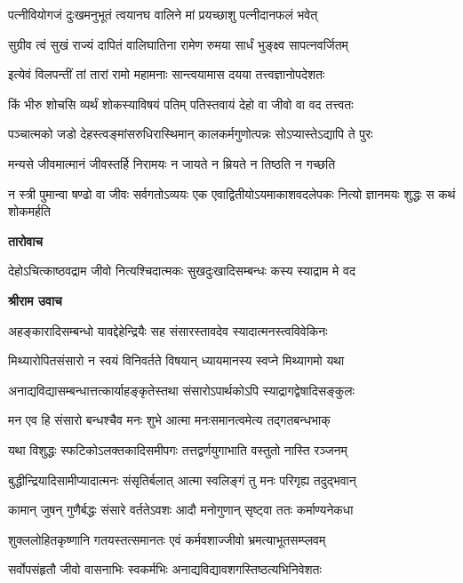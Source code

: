 \twolineshloka
{पत्नीवियोगजं दुःखमनुभूतं त्वयानघ}
{वालिने मां प्रयच्छाशु पत्नीदानफलं भवेत्} %

\twolineshloka
{सुग्रीव त्वं सुखं राज्यं दापितं वालिघातिना}
{रामेण रुमया सार्धं भुङ्क्ष्व सापत्नवर्जितम्} %

\twolineshloka
{इत्येवं विलपन्तीं तां तारां रामो महामनाः}
{सान्त्वयामास दयया तत्त्वज्ञानोपदेशतः} %

\twolineshloka
{किं भीरु शोचसि व्यर्थं शोकस्याविषयं पतिम्}
{पतिस्तवायं देहो वा जीवो वा वद तत्त्वतः} %

\twolineshloka
{पञ्चात्मको जडो देहस्त्वङ्मांसरुधिरास्थिमान्}
{कालकर्मगुणोत्पन्नः सोऽप्यास्तेऽद्यापि ते पुरः} %

\twolineshloka
{मन्यसे जीवमात्मानं जीवस्तर्हि निरामयः}
{न जायते न म्रियते न तिष्ठति न गच्छति} %

\threelineshloka
{न स्त्री पुमान्वा षण्ढो वा जीवः सर्वगतोऽव्ययः}
{एक एवाद्वितीयोऽयमाकाशवदलेपकः}
{नित्यो ज्ञानमयः शुद्धः स कथं शोकमर्हति} %

\textbf{तारोवाच}

\twolineshloka
{देहोऽचित्काष्ठवद्राम जीवो नित्यश्चिदात्मकः}
{सुखदुःखादिसम्बन्धः कस्य स्याद्राम मे वद} %

\textbf{श्रीराम उवाच}

\twolineshloka
{अहङ्कारादिसम्बन्धो यावद्देहेन्द्रियैः सह}
{संसारस्तावदेव स्यादात्मनस्त्वविवेकिनः} %

\twolineshloka
{मिथ्यारोपितसंसारो न स्वयं विनिवर्तते}
{विषयान् ध्यायमानस्य स्वप्ने मिथ्यागमो यथा} %

\twolineshloka
{अनाद्यविद्यासम्बन्धात्तत्कार्याहङ्कृतेस्तथा}
{संसारोऽपार्थकोऽपि स्याद्रागद्वेषादिसङ्कुलः} %

\twolineshloka
{मन एव हि संसारो बन्धश्चैव मनः शुभे}
{आत्मा मनःसमानत्वमेत्य तद्गतबन्धभाक्} %

\twolineshloka
{यथा विशुद्धः स्फटिकोऽलक्तकादिसमीपगः}
{तत्तद्वर्णयुगाभाति वस्तुतो नास्ति रञ्जनम्} %

\twolineshloka
{बुद्धीन्द्रियादिसामीप्यादात्मनः संसृतिर्बलात्}
{आत्मा स्वलिङ्गं तु मनः परिगृह्य तदुद्भवान्} %

\twolineshloka
{कामान् जुषन् गुणैर्बद्धः संसारे वर्ततेऽवशः}
{आदौ मनोगुणान् सृष्ट्वा ततः कर्माण्यनेकधा} %

\twolineshloka
{शुक्ललोहितकृष्णानि गतयस्तत्समानतः}
{एवं कर्मवशाज्जीवो भ्रमत्याभूतसम्प्लवम्} %

\twolineshloka
{सर्वोपसंहृतौ जीवो वासनाभिः स्वकर्मभिः}
{अनाद्यविद्यावशगस्तिष्ठत्यभिनिवेशतः} %

